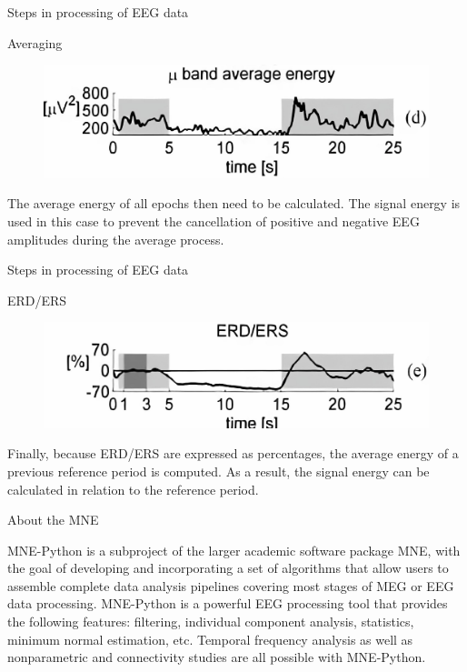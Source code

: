 \documentclass{beamer}
\begin{document}
\begin{frame}
{\centerline{Steps in processing of EEG data}}
{\centerline{Averaging}}
\begin{figure}
    \centering
    \includegraphics[width=\linewidth]{P2023.AIBCCSS.BrainSignals/averaging.jpg}
\end{figure}
    The average energy of all epochs then need to be calculated. The signal energy is used in this case to prevent the cancellation of positive and negative EEG amplitudes during the average process.
\end{frame}

\begin{frame}
{\centerline{Steps in processing of EEG data}}
{\centerline{ERD/ERS}}
    \begin{figure}
        \centering
        \includegraphics[width=\linewidth]{P2023.AIBCCSS.BrainSignals/ERD.jpg}
    \end{figure}
    Finally, because ERD/ERS are expressed as percentages, the average energy of a previous reference period is computed. As a result, the signal energy can be calculated in relation to the reference period.
\end{frame}

\begin{frame}
{\centerline{About the MNE}}
    MNE-Python is a subproject of the larger academic software package MNE, with the goal of developing and incorporating a set of algorithms that allow users to assemble complete data analysis pipelines covering most stages of MEG or EEG data processing. MNE-Python is a powerful EEG processing tool that provides the following features: filtering, individual component analysis, statistics, minimum normal estimation, etc. Temporal frequency analysis as well as nonparametric and connectivity studies are all possible with MNE-Python.
\end{frame}
\end{document}
